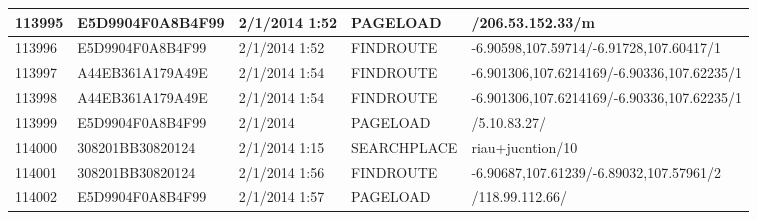 \begin{longtable}{|p{1cm}|l|l|l|p{8cm}|}
113995         & E5D9904F0A8B4F99 & 2/1/2014 1:52            & PAGELOAD        & /206.53.152.33/m                                                                                                                                                                                                      \\ \hline
113996         & E5D9904F0A8B4F99 & 2/1/2014 1:52            & FINDROUTE       & -6.90598,107.59714/-6.91728,107.60417/1                                                                                                                                                                               \\ \hline
113997         & A44EB361A179A49E & 2/1/2014 1:54            & FINDROUTE       & -6.901306,107.6214169/-6.90336,107.62235/1                                                                                                                                                                            \\ \hline
113998         & A44EB361A179A49E & 2/1/2014 1:54            & FINDROUTE       & -6.901306,107.6214169/-6.90336,107.62235/1                                                                                                                                                                            \\ \hline
113999         & E5D9904F0A8B4F99 & 2/1/2014                 & PAGELOAD        & /5.10.83.27/                                                                                                                                                                                                          \\ \hline
114000         & 308201BB30820124 & 2/1/2014 1:15            & SEARCHPLACE     & riau+jucntion/10                                                                                                                                                                                                      \\ \hline
114001         & 308201BB30820124 & 2/1/2014 1:56            & FINDROUTE       & -6.90687,107.61239/-6.89032,107.57961/2                                                                                                                                                                               \\ \hline
114002         & E5D9904F0A8B4F99 & 2/1/2014 1:57            & PAGELOAD        & /118.99.112.66/                                                                                                                                                                                                       \\ \hline

\end{longtable}
